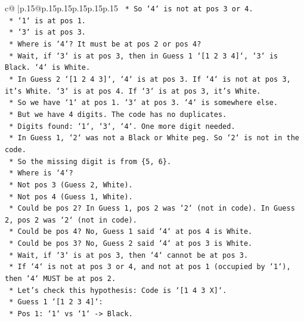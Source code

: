 \documentclass{article}
\begin{document}
{\begin{supertabular}{c@{$\;$}|p{.15\linewidth}@{}p{.15\linewidth}p{.15\linewidth}p{.15\linewidth}p{.15\linewidth}p{.15\linewidth}}
{{{\texttt{            *   So `4` is not at pos 3 or 4.} \\
\texttt{            *   `1` is at pos 1.} \\
\texttt{            *   `3` is at pos 3.} \\
\texttt{            *   Where is `4`? It must be at pos 2 or pos 4?} \\
\texttt{            *   Wait, if `3` is at pos 3, then in Guess 1 `{[}1 2 3 4{]}`, `3` is Black. `4` is White.} \\
\texttt{            *   In Guess 2 `{[}1 2 4 3{]}`, `4` is at pos 3. If `4` is not at pos 3, it's White. `3` is at pos 4. If `3` is at pos 3, it's White.} \\
\texttt{            *   So we have `1` at pos 1. `3` at pos 3. `4` is somewhere else.} \\
\texttt{            *   But we have 4 digits. The code has no duplicates.} \\
\texttt{            *   Digits found: `1`, `3`, `4`. One more digit needed.} \\
\texttt{            *   In Guess 1, `2` was not a Black or White peg. So `2` is not in the code.} \\
\texttt{            *   So the missing digit is from \{5, 6\}.} \\
\texttt{            *   Where is `4`?} \\
\texttt{                *   Not pos 3 (Guess 2, White).} \\
\texttt{                *   Not pos 4 (Guess 1, White).} \\
\texttt{                *   Could be pos 2? In Guess 1, pos 2 was `2` (not in code). In Guess 2, pos 2 was `2` (not in code).} \\
\texttt{                *   Could be pos 4? No, Guess 1 said `4` at pos 4 is White.} \\
\texttt{                *   Could be pos 3? No, Guess 2 said `4` at pos 3 is White.} \\
\texttt{                *   Wait, if `3` is at pos 3, then `4` cannot be at pos 3.} \\
\texttt{                *   If `4` is not at pos 3 or 4, and not at pos 1 (occupied by `1`), then `4` MUST be at pos 2.} \\
\texttt{            *   Let's check this hypothesis: Code is `{[}1 4 3 X{]}`.} \\
\texttt{                *   Guess 1 `{[}1 2 3 4{]}`:} \\
\texttt{                    *   Pos 1: `1` vs `1` {-}> Black.} \\
}}}
\end{supertabular}}
\end{document}
